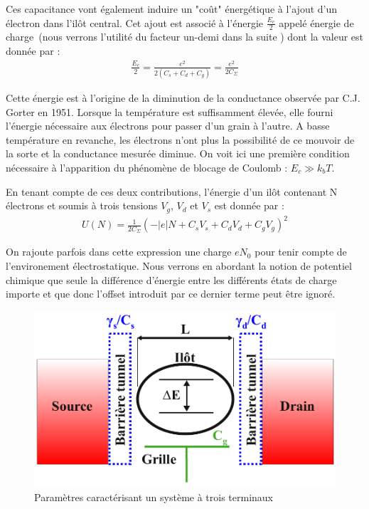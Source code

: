 Ces capacitance vont également induire un "co\^ut" énergétique à l'ajout d'un électron dans l'il\^ot central. Cet ajout est associé à l'énergie $\frac{E_c}{2}$ appelé énergie de charge~(nous verrons l'utilité du facteur un-demi dans la suite ) dont la valeur est donnée par :
\begin{eqnarray}
\frac{E_c}{2} = \frac{e^2}{2(C_s+C_d+C_g)}=\frac{e^2}{2C_{\Sigma}} \nonumber
\end{eqnarray}


Cette énergie est à l'origine de la diminution de la conductance observée par C.J. Gorter en 1951. Lorsque la température est suffisamment élevée, elle fourni l'énergie nécessaire aux électrons pour passer d'un grain à l'autre. A basse température en revanche, les électrons n'ont plus la possibilité de ce mouvoir de la sorte et la conductance mesurée diminue. On voit ici une première condition nécessaire à l'apparition du phénomène de blocage de Coulomb : $E_c \gg k_bT$.

En tenant compte de ces deux contributions, l'énergie d'un il\^ot contenant N électrons et soumis à trois tensions $V_g$, $V_d$ et $V_s$ est donnée par :
\begin{eqnarray}
U(N) = \frac{1}{2C_{\Sigma}} (-|e|N + C_sV_s + C_dV_d + C_gV_g)^2
\end{eqnarray}

On rajoute parfois dans cette expression une charge $eN_0$ pour tenir compte de l'environement électrostatique. Nous verrons en abordant la notion de potentiel chimique que seule la différence d'énergie entre les différents états de charge importe et que donc l'offset introduit par ce dernier terme peut \^etre ignoré.

\begin{figure}
\includegraphics[scale=1]{Theorie/Transport/figure1/figure1ThTr.pdf} 
\caption{Paramètres caractérisant un système à trois terminaux}
\label{description_systeme}
\end{figure}



